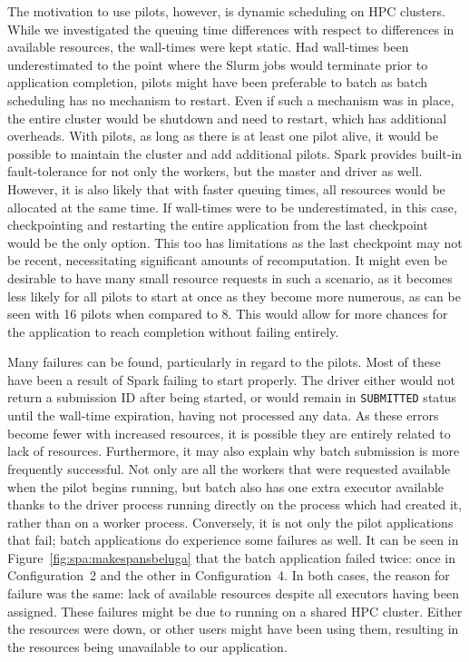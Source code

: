     The motivation to use pilots, however, is dynamic scheduling on HPC
    clusters. While we investigated the queuing time differences with respect to
    differences in available resources, the wall-times were kept static. Had
    wall-times been underestimated to the point where the Slurm jobs would
    terminate prior to application completion, pilots might have been preferable
    to batch as batch scheduling has no mechanism to restart. Even if such a
    mechanism was in place, the entire cluster would be shutdown and need to
    restart, which has additional overheads. With pilots, as long as there is at
    least one pilot alive, it would be possible to maintain the cluster and add
    additional pilots. Spark provides built-in fault-tolerance for not only the
    workers, but the master and driver as well. However, it is also likely that
    with faster queuing times, all resources would be allocated at the same
    time. If wall-times were to be underestimated, in this case, checkpointing
    and restarting the entire application from the last checkpoint would be the
    only option. This too has limitations as the last checkpoint may not be
    recent, necessitating significant amounts of recomputation. It might even be
    desirable to have many small resource requests in such a scenario, as it
    becomes less likely for all pilots to start at once as they become more
    numerous, as can be seen with 16 pilots when compared to 8. This would allow
    for more chances for the application to reach completion without failing
    entirely.
    
    Many failures can be found, particularly in regard to the pilots. Most of
    these have been a result of Spark failing to start properly. The driver
    either would not return a submission ID after being started, or would remain
    in \texttt{SUBMITTED} status until the wall-time expiration, having not
    processed any data. As these errors become fewer with increased resources,
    it is possible they are entirely related to lack of resources. Furthermore,
    it may also explain why batch submission is more frequently successful. Not
    only are all the workers that were requested available when the pilot begins
    running, but batch also has one extra executor available thanks to the
    driver process running directly on the process which had created it, rather
    than on a worker process. Conversely, it is not only the pilot applications
    that fail; batch applications do experience some failures as well. It can be
    seen in Figure~\ref{fig:spa:makespansbeluga} that the batch application
    failed twice: once in Configuration~2 and the other in Configuration~4. In
    both cases, the reason for failure was the same: lack of available resources
    despite all executors having been assigned. These failures might be due to
    running on a shared HPC cluster. Either the resources were down, or other
    users might have been using them, resulting in the resources being
    unavailable to our application.
    
